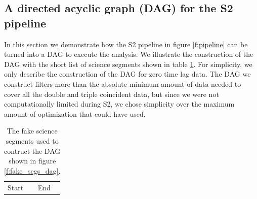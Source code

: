 \subsection{A directed acyclic graph (DAG) for the S2 pipeline}
\label{ss:dag}

In this section we demonstrate how the S2 pipeline in figure \ref{f:pipeline}
can be turned into a DAG to execute the analysis. We illustrate the
construction of the DAG with the short list of science segments shown in table
\ref{t:fakesegslist}. For simplicity, we only describe the construction of the
DAG for zero time lag data. The DAG we construct filters more than the
absolute minimum amount of data needed to cover all the double and triple
coincident data, but since we were not computationally limited during S2, we
chose simplicity over the maximum amount of optimization that could have used.

\begin{table}[h]
\begin{center}
\begin{tabular}{ll}
Start&End
\end{tabular}
\end{center}
\caption{\label{t:fakesegslist}%
The fake science segments used to contruct the DAG shown in figure
\ref{f:fake_segs_dag}.
}
\end{table}

